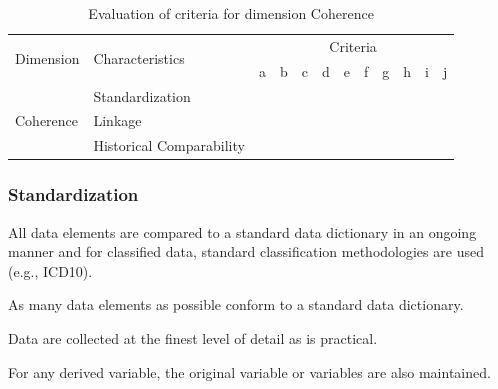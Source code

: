 \begin{table}[htbp]
    \centering

    \begin{tabular}{llrrrrrrrrrr}
        \toprule
        \multirow{2}{*}{Dimension}  & \multirow{2}{*}{Characteristics}  & \multicolumn{10}{c}{Criteria}         \\ \cmidrule(lr){3-12}
                                    &                                   & a & b & c & d & e & f & g & h & i & j \\ \midrule
        \multirow{3}{*}{Coherence}  & Standardization                   &   &   &   &   &   &   &   &   &   &   \\
                                    & Linkage                           &   &   &   &   &   &   &   &   &   &   \\
                                    & Historical Comparability          &   &   &   &   &   &   &   &   &   &   \\
        \bottomrule
    \end{tabular}

    \caption{Evaluation of criteria for dimension Coherence}
    \label{table:coherence-benchmark}
\end{table}
\FloatBarrier

\subsubsection{Standardization}

\begin{QandA}
    \item All data elements are compared to a standard data dictionary in an ongoing manner and for classified data, standard classification methodologies are used (e.g., ICD10).
    \begin{answered}
        
    \end{answered}

    \item As many data elements as possible conform to a standard data dictionary.
    \begin{answered}
        
    \end{answered}

    \item Data are collected at the finest level of detail as is practical.
    \begin{answered}
        
    \end{answered}

    \item For any derived variable, the original variable or variables are also maintained.
    \begin{answered}
        
    \end{answered}

\end{QandA}

